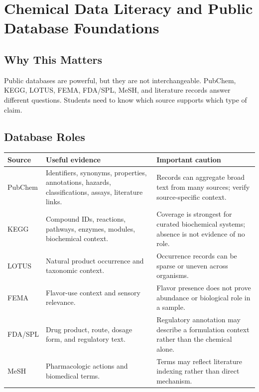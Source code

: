 \chapter{Chemical Data Literacy and Public Database Foundations}


\section{Why This Matters}
Public databases are powerful, but they are not interchangeable. PubChem, KEGG, LOTUS, FEMA, FDA/SPL, MeSH, and literature records answer different questions. Students need to know which source supports which type of claim.

\section{Database Roles}
\begin{tabularx}{\textwidth}{p{}Y Y}
\toprule
\textbf{Source} & \textbf{Useful evidence} & \textbf{Important caution}\\
\midrule
PubChem & Identifiers, synonyms, properties, annotations, hazards, classifications, assays, literature links. & Records can aggregate broad text from many sources; verify source-specific context.\\
KEGG & Compound IDs, reactions, pathways, enzymes, modules, biochemical context. & Coverage is strongest for curated biochemical systems; absence is not evidence of no role.\\
LOTUS & Natural product occurrence and taxonomic context. & Occurrence records can be sparse or uneven across organisms.\\
FEMA & Flavor-use context and sensory relevance. & Flavor presence does not prove abundance or biological role in a sample.\\
FDA/SPL & Drug product, route, dosage form, and regulatory text. & Regulatory annotation may describe a formulation context rather than the chemical alone.\\
MeSH & Pharmacologic actions and biomedical terms. & Terms may reflect literature indexing rather than direct mechanism.\\
\bottomrule
\end{tabularx}

